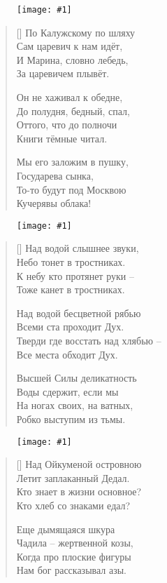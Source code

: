 \documentclass[12pt,a5paper,twoside]{article}
\newcommand{\pict}[1]{\thispagestyle{empty}\begin{figure}[H]\begin{center}\texttt{[image: \#1]}\end{center}\end{figure}\newpage}
\begin{document}
\pict{picts/po_Kalugskomu_po_shlyaxu} 


\settowidth{\versewidth}{По Калужскому по шляху}
\begin{verse}[\versewidth]
По Калужскому по шляху\\
Сам царевич к нам идёт,\\
И Марина, словно лебедь,\\
За царевичем плывёт.

Он не хаживал к обедне,\\
До полудня, бедный, спал,\\
Оттого, что до полночи\\
Книги тёмные читал.

Мы его заложим в пушку,\\
Государева сынка,\\
То-то будут под Москвою\\
Кучерявы облака!
\end{verse}
\newpage

\pict{picts/nad_vodoy_slishnee_zvuki} 


\settowidth{\versewidth}{Над водой слышнее звуки,}
\begin{verse}[\versewidth]
Над водой слышнее звуки,\\
Небо тонет в тростниках.\\
К небу кто протянет руки –\\
Тоже канет в тростниках.

Над водой бесцветной рябью\\
Всеми ста проходит Дух.\\
Тверди где восстать над хлябью –\\
Все места обходит Дух.

Высшей Силы деликатность\\
Воды сдержит, если мы\\
На ногах своих, на ватных,\\
Робко выступим из тьмы.
\end{verse}
\newpage

\pict{picts/nad_Oykumenoy_ostrovnoyu} 


\settowidth{\versewidth}{Над Ойкуменой островною}
\begin{verse}[\versewidth]
Над Ойкуменой островною\\
Летит заплаканный Дедал.\\
Кто знает в жизни основное?\\
Кто хлеб со знаками едал?

Еще дымящаяся шкура\\
Чадила – жертвенной козы,\\
Когда про плоские фигуры\\
Нам бог рассказывал азы.
\end{verse}
\newpage
\end{document}
